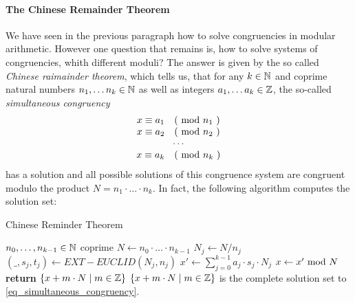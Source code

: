 \paragraph{The Chinese Remainder Theorem} We have seen in the previous paragraph how to solve congruencies in modular arithmetic. However one question that remains is, how to solve systems of congruencies, whith different moduli? The answer is given by the so called \textit{Chinese raimainder theorem}, which tells us, that for any $ k \in \mathbb{N} $ and coprime natural numbers $ n_1, \ldots n_k \in \mathbb{N} $ as well as integers $ a_1, \ldots a_k \in \mathbb{Z} $, the so-called \textit{simultaneous congruency}
\begin{equation}
\label{eq_simultaneous_congruency}
\begin{array}{c}
x \equiv a_1 \quad \text{( mod } n_1 \text{ )} \\
x \equiv a_2 \quad \text{( mod } n_2 \text{ )} \\
\cdots \\
x \equiv a_k \quad \text{( mod } n_k \text{ )} \\
\end{array}
\end{equation}
has a solution and all possible solutions of this congruence system are congruent modulo
the product $N= n_1 \cdot \ldots \cdot n_k $. In fact, the following algorithm computes the solution set:
\begin{algorithm}\caption{Chinese Reminder Theorem}
\label{alg_ext_euclid_alg}
\begin{algorithmic}[0]
\Require $n_0,\ldots,n_{k-1} \in \mathbb{N}$ coprime
\State $N\gets n_0\cdot \ldots \cdot n_{k-1}$
\State $N_j\gets N/n_j$
\State $(\_,s_j,t_j)\gets EXT-EUCLID (N_j,n_j)$ 
\EndWhile
\State $x'\gets \sum_{j=0}^{k-1}a_j\cdot s_j\cdot N_j$
\State $x\gets x' \text{ mod } N$
\State \textbf{return} $\{x+ m\cdot N\;|\; m\in \mathbb{Z}\}$
\EndProcedure
\Ensure $\{x+ m\cdot N\;|\; m\in \mathbb{Z}\}$ is the complete solution set to \ref{eq_simultaneous_congruency}.
\end{algorithmic}
\end{algorithm}

